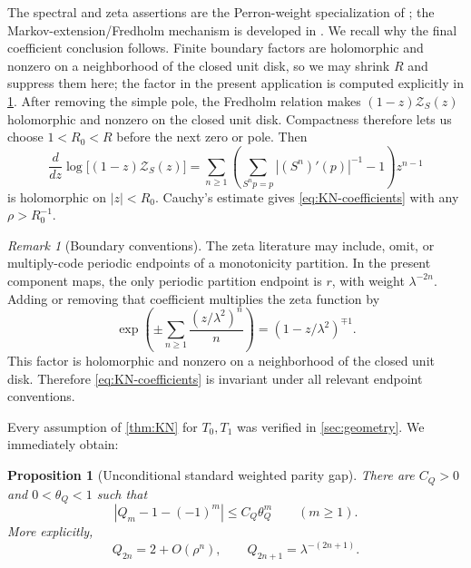 \documentclass[11pt]{article}
\newtheorem{proposition}[theorem]{Proposition}
\theoremstyle{definition}
\theoremstyle{remark}
\newtheorem{remark}[theorem]{Remark}
\newcommand{\cZ}{\mathcal Z}
\begin{document}
The spectral and zeta assertions are the Perron-weight specialization of
\citet{KellerNowicki1992}; the Markov-extension/Fredholm mechanism is developed
in \citet{Keller1989}.  We recall why the final coefficient conclusion follows.
Finite boundary factors are holomorphic and nonzero on a neighborhood of the
closed unit disk, so we may shrink $R$ and suppress them here; the factor in
the present application is computed explicitly in \cref{rem:boundary}.
After removing the simple pole, the Fredholm relation makes
$(1-z)\cZ_S(z)$ holomorphic and nonzero on the closed unit disk.  Compactness
therefore lets us choose $1<R_0<R$ before the next zero or pole.
Then
\begin{equation}\label{eq:log-derivative}
 \frac{d}{dz}\log\bigl[(1-z)\cZ_S(z)\bigr]
 =\sum_{n\ge1}\left(
 \sum_{S^n p=p}|(S^n)'(p)|^{-1}-1
 \right)z^{n-1}
\end{equation}
is holomorphic on $|z|<R_0$.  Cauchy's estimate gives
\eqref{eq:KN-coefficients} with any $\rho>R_0^{-1}$.

\begin{remark}[Boundary conventions]
\label{rem:boundary}
The zeta literature may include, omit, or multiply-code periodic endpoints of
a monotonicity partition.  In the present component maps, the only periodic
partition endpoint is $r$, with weight $\lambda^{-2n}$.  Adding or removing
that coefficient multiplies the zeta function by
\begin{equation}\label{eq:boundary-factor}
 \exp\left(\pm\sum_{n\ge1}\frac{(z/\lambda^2)^n}{n}\right)
 =(1-z/\lambda^2)^{\mp1}.
\end{equation}
This factor is holomorphic and nonzero on a neighborhood of the closed unit
disk.  Therefore \eqref{eq:KN-coefficients} is invariant under all relevant
endpoint conventions.
\end{remark}

Every assumption of \cref{thm:KN} for $T_0,T_1$ was verified in
\cref{sec:geometry}.  We immediately obtain:

\begin{proposition}[Unconditional standard weighted parity gap]
\label{prop:Q-gap}
There are $C_Q>0$ and $0<\theta_Q<1$ such that
\begin{equation}\label{eq:Q-gap}
 |Q_m-1-(-1)^m|\le C_Q\theta_Q^m
 \qquad(m\ge1).
\end{equation}
More explicitly,
\begin{equation}\label{eq:Q-parity}
 Q_{2n}=2+O(\rho^n),
 \qquad
 Q_{2n+1}=\lambda^{-(2n+1)}.
\end{equation}
\end{proposition}
\end{document}
